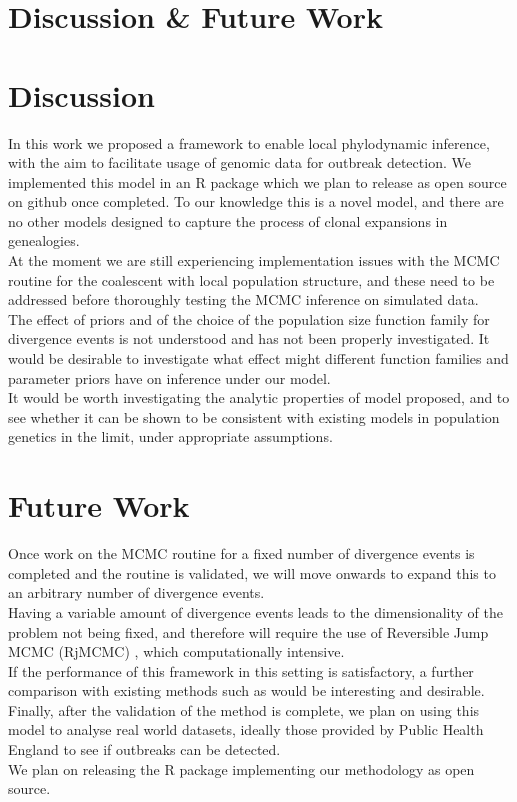 \documentclass{ieeeaccess}
\theoremstyle{definition}
\begin{document}
\section{Discussion \& Future Work}
\section{Discussion}
In this work we proposed a framework to enable local phylodynamic inference, with the aim to facilitate usage of genomic data for outbreak detection.
We implemented this model in an R package which we plan to release as open source on github once completed. To our knowledge this is a novel model, and there are no other models designed to capture the process of clonal expansions in genealogies.\\
At the moment we are still experiencing implementation issues with the MCMC routine for the coalescent with local population structure, and these need to be addressed before thoroughly testing the MCMC inference on simulated data.\\ 
The effect of priors and of the choice of the population size function family for divergence events is not understood and has not  been properly investigated. It would be desirable to investigate what effect might different function families and parameter priors have on inference under our model.\\
It would be worth investigating the analytic properties of model proposed, and to see whether it can be shown to be consistent with existing models in population genetics in the limit, under appropriate assumptions.\\ 
\section{Future Work}
Once work on the MCMC routine for a fixed number of divergence events is completed and the routine is validated, we will move onwards to expand this to an arbitrary number of divergence events.\\
Having a variable amount of divergence events leads to the dimensionality of the problem not being fixed, and therefore will require the use of Reversible Jump MCMC (RjMCMC) \cite{green_reversible_1995, fan_reversible_2010}, which computationally intensive.\\
If the performance of this framework in this setting is satisfactory, a further comparison with existing methods such as \cite{volz_identification_nodate,barido-sottani_multitype_2020} would be interesting and desirable.\\
Finally, after the validation of the method is complete, we plan on using this model to analyse real world datasets, ideally those provided by Public Health England to see if outbreaks can be detected.\\
We plan on releasing the R package implementing our methodology as open source. 
\begin{thebibliography}{00}
\printbibliography
\end{thebibliography}
\EOD
\end{document}

